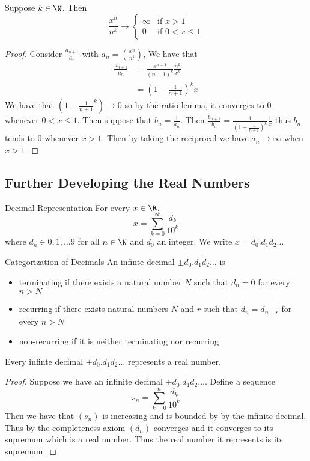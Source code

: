 \begin{thm}{}{} Suppose $k\in\N$. Then
$$\frac{x^n}{n^k}\to\begin{cases}
\infty & \text{if $x>1$} \\
0 & \text{if $0<x\leq1$} 
\end{cases}$$\tcbline
\begin{proof} Consider $\frac{a_{n+1}}{a_n}$ with $a_n=\left(\frac{x^n}{n^k}\right)$, We have that 
\begin{align*}
\frac{a_{n+1}}{a_n}&=\frac{x^{n+1}}{(n+1)^k}\frac{n^k}{x^n} \\
&=\left(1-\frac{1}{n+1}\right)^kx
\end{align*}
We have that $\left(1-\frac{1}{n+1}^k\right)\to 0$ so by the ratio lemma, it converges to $0$ whenever $0<x\leq1$. Then suppose that $b_n=\frac{1}{a_n}$. Then $\frac{b_{n+1}}{b_n}=\frac{1}{\left(1-\frac{1}{n+1}\right)^k}\frac{1}{x}$ thus $b_n$ tends to $0$ whenever $x>1$. Then by taking the reciprocal we have $a_n\to\infty$ when $x>1$. 
\end{proof}
\end{thm}

\subsection{Further Developing the Real Numbers}
\begin{defn}{Decimal Representation}{} For every $x\in\R$, $$x=\sum_{k=0}^{\infty}\frac{d_k}{10^k}$$ where $d_n\in{0,1,\dots9}$ for all $n\in\N$ and $d_0$ an integer. We write $x=d_0.d_1d_2\dots$
\end{defn}

\begin{defn}{Categorization of Decimals}{} An infinte decimal $\pm d_0.d_1d_2\dots$ is
\begin{itemize}
\item terminating if there exists a natural number $N$ such that $d_n=0$ for every $n>N$
\item recurring if there exists natural numbers $N$ and $r$ such that $d_n=d_{n+r}$ for every $n>N$
\item non-recurring if it is neither terminating nor recurring
\end{itemize}
\end{defn}

\begin{thm}{}{} Every infinte decimal $\pm d_0.d_1d_2\dots$ represents a real number. \tcbline
\begin{proof} Suppose we have an infinite decimal $\pm d_0.d_1d_2\dots$. Define a sequence $$s_n=\sum_{k=0}^{n}\frac{d_k}{10^k}$$ Then we have that $(s_n)$ is increasing and is bounded by by the infinite decimal. Thus by the completeness axiom $(d_n)$ converges and it converges to its supremum which is a real number. Thus the real number it represents is its supremum. 
\end{proof}
\end{thm}


